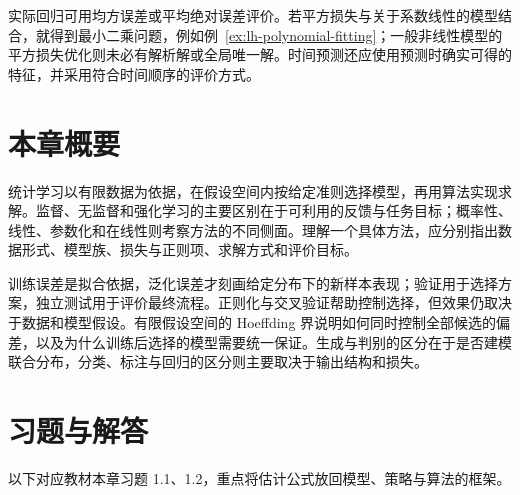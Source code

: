 实际回归可用均方误差或平均绝对误差评价。若平方损失与关于系数线性的模型结合，就得到最小二乘问题，例如例~\ref{ex:lh-polynomial-fitting}；一般非线性模型的平方损失优化则未必有解析解或全局唯一解。时间预测还应使用预测时确实可得的特征，并采用符合时间顺序的评价方式。

\section*{本章概要}

统计学习以有限数据为依据，在假设空间内按给定准则选择模型，再用算法实现求解。监督、无监督和强化学习的主要区别在于可利用的反馈与任务目标；概率性、线性、参数化和在线性则考察方法的不同侧面。理解一个具体方法，应分别指出数据形式、模型族、损失与正则项、求解方式和评价目标。

训练误差是拟合依据，泛化误差才刻画给定分布下的新样本表现；验证用于选择方案，独立测试用于评价最终流程。正则化与交叉验证帮助控制选择，但效果仍取决于数据和模型假设。有限假设空间的 Hoeffding 界说明如何同时控制全部候选的偏差，以及为什么训练后选择的模型需要统一保证。生成与判别的区分在于是否建模联合分布，分类、标注与回归的区分则主要取决于输出结构和损失。

\section*{习题与解答}

以下对应教材本章习题 1.1、1.2，重点将估计公式放回模型、策略与算法的框架。

